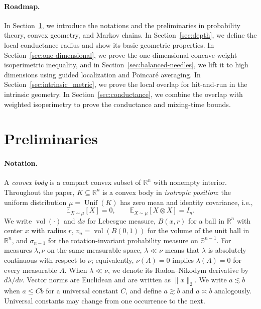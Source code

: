 \documentclass[11pt]{article}
\theoremstyle{definition}
\theoremstyle{remark}
\newcommand{\E}{\mathbb E}
\newcommand{\R}{\mathbb R}
\newcommand{\vol}{\operatorname{vol}}
\begin{document}
\paragraph{Roadmap.} In Section~\ref{sec:preliminaries}, we introduce the notations and the preliminaries in probability theory, convex geometry, and Markov chains.  In Section~\ref{sec:depth}, we define the local conductance radius and show its basic geometric properties. In Section~\ref{sec:one-dimensional}, we prove the one-dimensional concave-weight isoperimetric inequality, and in Section~\ref{sec:balanced-needles}, we lift it to high dimensions using guided localization and Poincar\'e averaging. In Section~\ref{sec:intrinsic_metric}, we prove the local overlap for hit-and-run in the intrinsic geometry. In Section~\ref{sec:conductance}, we combine the overlap with weighted isoperimetry to prove the conductance and mixing-time bounds. %


\section{Preliminaries}\label{sec:preliminaries}
\paragraph{Notation.} A \emph{convex body} is a compact convex subset of \(\R^n\) with nonempty interior.  Throughout the paper, $K\subseteq\R^n$ is a convex body in \emph{isotropic position}: the uniform distribution $\mu=\operatorname{Unif}(K)$ has zero mean and identity covariance, i.e.,
\begin{equation}\label{eq:isotropic}
 \E_{X\sim\mu}[X]=0,
 \qquad
 \E_{X\sim\mu}[X\otimes X]=I_n.
\end{equation}
We write \(\vol(\cdot)\) and \(dx\) for Lebesgue measure, $B(x,r)$ for a ball in $\R^n$ with center $x$ with radius $r$, $v_n=\vol(B(0,1))$ for the volume of the unit ball in $\R^n$, and \(\sigma_{n-1}\) for the rotation-invariant probability measure on \(\mathbb{S}^{n-1}\). For measures $\lambda,\nu$ on the same measurable space, $\lambda\ll\nu$ means that $\lambda$ is absolutely continuous with respect to \(\nu\); equivalently, \(\nu(A)=0\) implies \(\lambda(A)=0\) for every measurable \(A\).  When \(\lambda\ll\nu\), we denote its Radon--Nikodym derivative by \(d\lambda/d\nu\).
Vector norms are Euclidean and are written as \(\|x\|_2\).  We write $a\lesssim b$ when \(a\le Cb\) for a universal constant \(C\), and define \(a\gtrsim b\) and \(a\asymp b\) analogously.  Universal constants may change from one occurrence to the next.
\end{document}
